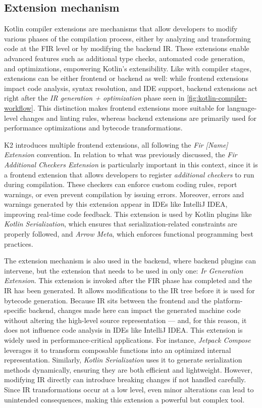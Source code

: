 \documentclass[12pt,a4paper,openright,twoside]{book}
\begin{document}
\subsection{Extension mechanism}

Kotlin compiler extensions are mechanisms that allow developers to modify
various phases of the compilation process, either by analyzing and transforming
code at the \ac{FIR} level or by modifying the backend \ac{IR}. These extensions
enable advanced features such as additional type checks, automated code
generation, and optimizations, empowering Kotlin’s extensibility.
%
Like with compiler stages, extensions can be either frontend or backend as well:
while frontend extensions impact code analysis, syntax resolution, and IDE
support, backend extensions act right after the \emph{IR generation +
optimization} phase seen in \cref{fig:kotlin-compiler-workflow}. This
distinction makes frontend extensions more suitable for language-level changes
and linting rules, whereas backend extensions are primarily used for performance
optimizations and bytecode transformations.

K2 introduces multiple frontend extensions, all following the
\emph{Fir [Name] Extension} convention. In relation to what was previously
discussed, the \emph{Fir Additional Checkers Extension} is particularly
important in this context, since it is a frontend extension that allows
developers to register \emph{additional checkers} to run during compilation.
These checkers can enforce custom coding rules, report warnings, or even prevent
compilation by issuing errors. Moreover, errors and warnings generated by this
extension appear in IDEs like IntelliJ IDEA, improving real-time code feedback.
This extension is used by Kotlin plugins like \emph{Kotlin Serialization},
which ensures that serialization-related constraints are properly followed, and
\emph{Arrow Meta}, which enforces functional programming best practices.

The extension mechanism is also used in the backend, where backend plugins can
intervene, but the extension that needs to be used in only one: \emph{Ir
Generation Extension}. This extension is invoked after the \ac{FIR} phase has
completed and the \ac{IR} has been generated. It allows modifications to the IR
tree before it is used for bytecode generation. Because IR sits between the
frontend and the platform-specific backend, changes made here can impact the
generated machine code without altering the high-level source representation ---
and, for this reason, it does not influence code analysis in \acp{IDE} like
IntelliJ IDEA. This extension is widely used in performance-critical
applications. For instance, \emph{Jetpack Compose} leverages it to transform
composable functions into an optimized internal representation. Similarly,
\emph{Kotlin Serialization} uses it to generate serialization methods
dynamically, ensuring they are both efficient and lightweight. However,
modifying \ac{IR} directly can introduce breaking changes if not handled
carefully. Since \ac{IR} transformations occur at a low level, even minor
alterations can lead to unintended consequences, making this extension a
powerful but complex tool.
\end{document}
